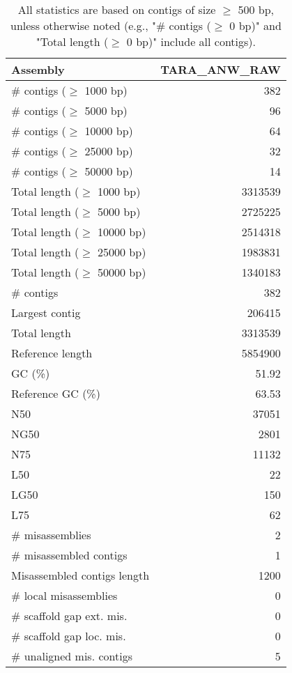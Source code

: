 \documentclass[12pt,a4paper]{article}
\begin{document}
\begin{table}[ht]
\begin{center}
\caption{All statistics are based on contigs of size $\geq$ 500 bp, unless otherwise noted (e.g., "\# contigs ($\geq$ 0 bp)" and "Total length ($\geq$ 0 bp)" include all contigs).}
\begin{tabular}{|l*{1}{|r}|}
\hline
Assembly & TARA\_ANW\_RAW \\ \hline
\# contigs ($\geq$ 1000 bp) & 382 \\ \hline
\# contigs ($\geq$ 5000 bp) & 96 \\ \hline
\# contigs ($\geq$ 10000 bp) & 64 \\ \hline
\# contigs ($\geq$ 25000 bp) & 32 \\ \hline
\# contigs ($\geq$ 50000 bp) & 14 \\ \hline
Total length ($\geq$ 1000 bp) & 3313539 \\ \hline
Total length ($\geq$ 5000 bp) & 2725225 \\ \hline
Total length ($\geq$ 10000 bp) & 2514318 \\ \hline
Total length ($\geq$ 25000 bp) & 1983831 \\ \hline
Total length ($\geq$ 50000 bp) & 1340183 \\ \hline
\# contigs & 382 \\ \hline
Largest contig & 206415 \\ \hline
Total length & 3313539 \\ \hline
Reference length & 5854900 \\ \hline
GC (\%) & 51.92 \\ \hline
Reference GC (\%) & 63.53 \\ \hline
N50 & 37051 \\ \hline
NG50 & 2801 \\ \hline
N75 & 11132 \\ \hline
L50 & 22 \\ \hline
LG50 & 150 \\ \hline
L75 & 62 \\ \hline
\# misassemblies & 2 \\ \hline
\# misassembled contigs & 1 \\ \hline
Misassembled contigs length & 1200 \\ \hline
\# local misassemblies & 0 \\ \hline
\# scaffold gap ext. mis. & 0 \\ \hline
\# scaffold gap loc. mis. & 0 \\ \hline
\# unaligned mis. contigs & 5 \\ \hline

\end{tabular}
\end{center}
\end{table}
\end{document}

